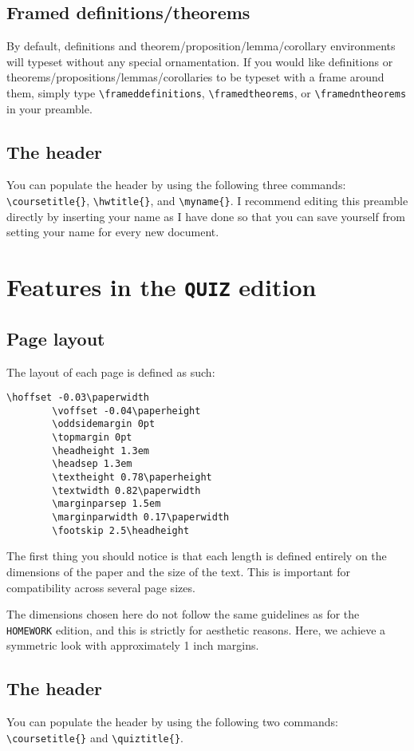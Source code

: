 \documentclass[letterpaper,12pt]{article}
\begin{document}
	\subsection{Framed definitions/theorems}
	By default, definitions and theorem/proposition/lemma/corollary 
	environments will typeset without any special ornamentation. If you would 
	like definitions or theorems/propositions/lemmas/corollaries to be typeset 
	with a frame around them, simply type \verb|\frameddefinitions|, 
	\verb|\framedtheorems|, or \verb|\framedntheorems| in your preamble.
	
	\subsection{The header}
	You can populate the header by using the following three commands: 
	\verb|\coursetitle{}|, \verb|\hwtitle{}|, and \verb|\myname{}|. I recommend 
	editing this preamble directly by inserting your name as I have done so 
	that you can save yourself from setting your name for every new document.

\section{Features in the \texttt{QUIZ} edition}

	\subsection{Page layout}
		The layout of each page is defined as such:
		\begin{Verbatim}[frame=single,gobble=2,fontsize=\small]
		\hoffset -0.03\paperwidth
		\voffset -0.04\paperheight
		\oddsidemargin 0pt
		\topmargin 0pt
		\headheight 1.3em
		\headsep 1.3em
		\textheight 0.78\paperheight
		\textwidth 0.82\paperwidth
		\marginparsep 1.5em
		\marginparwidth 0.17\paperwidth
		\footskip 2.5\headheight
		\end{Verbatim}
		The first thing you should notice is that each length is defined 
		entirely on the dimensions of the paper and the size of the text. This 
		is important for compatibility across several page sizes.
		
		The dimensions chosen here do not follow the same guidelines as for the
		\texttt{HOMEWORK} edition, and this is strictly for aesthetic reasons.
		Here, we achieve a symmetric look with approximately 1 inch margins.
	
	\subsection{The header}
		You can populate the header by using the following two commands: 
		\verb|\coursetitle{}| and \verb|\quiztitle{}|.
		
\end{document}
